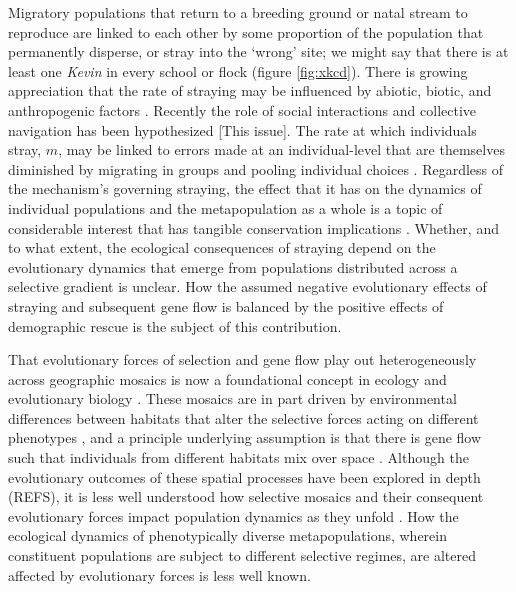\documentclass[twocolumn,preprintnumbers,amsmath,amssymb,superscriptaddress]{revtex4}
\begin{document}
Migratory populations that return to a breeding ground or natal stream to reproduce are linked to each other by some proportion of the population that permanently disperse, or stray into the `wrong' site; we might say that there is at least one \emph{Kevin} in every school or flock (figure \ref{fig:xkcd}).
There is growing appreciation that the rate of straying may be influenced by abiotic, biotic, and anthropogenic factors \cite{H:2013fs,Keefer:2014gg,Bett:2017ha}. 
Recently the role of social interactions and collective navigation has been hypothesized [This issue].
The rate at which individuals stray, $m$, may be linked to errors made at an individual-level that are themselves diminished by migrating in groups and pooling individual choices \cite{Berdahl:2015kv,Berdahl:2016dx}.
Regardless of the mechanism's governing straying, the effect that it has on the dynamics of individual populations and the metapopulation as a whole is a topic of considerable interest that has tangible conservation implications \cite{Brenner:2012gl,Johnson:2012fe,Fullerton:2011ii}.
Whether, and to what extent, the ecological consequences of straying depend on the evolutionary dynamics that emerge from populations distributed across a selective gradient is unclear.
How the assumed negative evolutionary effects of straying and subsequent gene flow is balanced by the positive effects of demographic rescue is the subject of this contribution.



That evolutionary forces of selection and gene flow play out heterogeneously across geographic mosaics is now a foundational concept in ecology and evolutionary biology \cite{Nuismer:1999ko,Thompson:2015hq,Nuismer:2000bb,Thompson:2005wf}.
These mosaics are in part driven by environmental differences between habitats that alter the selective forces acting on different phenotypes \cite{Endler:1986tz}, and a principle underlying assumption is that there is gene flow such that individuals from different habitats mix over space \cite{Gomulkiewicz:2000bz,Thompson:2002hr,Nuismer:2003eh,Nuismer:2006be,Forde:2008kc,Guimaraes:2011hu,Gibert:2013hp}.
Although the evolutionary outcomes of these spatial processes have been explored in depth (REFS), it is less well understood how selective mosaics and their consequent evolutionary forces impact population dynamics as they unfold \cite{Hendry:2016un}.
How the ecological dynamics of phenotypically diverse metapopulations, wherein constituent populations are subject to different selective regimes, are altered affected by evolutionary forces is less well known. %
\end{document}

